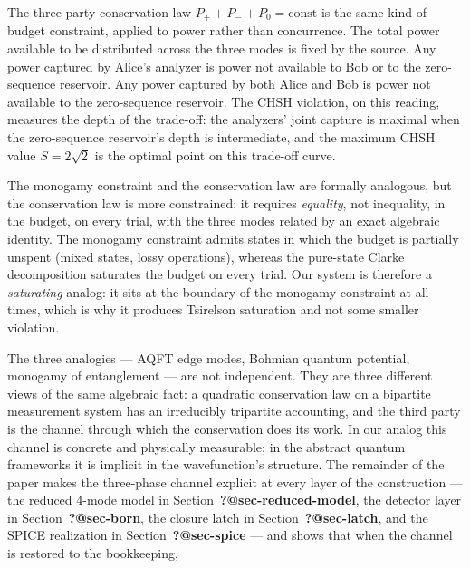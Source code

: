 \documentclass[
  11pt]{article}
\begin{document}
The three-party conservation law \(P_+ + P_- + P_0 = \mathrm{const}\) is
the same kind of budget constraint, applied to power rather than
concurrence. The total power available to be distributed across the
three modes is fixed by the source. Any power captured by Alice's
analyzer is power not available to Bob or to the zero-sequence
reservoir. Any power captured by both Alice and Bob is power not
available to the zero-sequence reservoir. The CHSH violation, on this
reading, measures the depth of the trade-off: the analyzers' joint
capture is maximal when the zero-sequence reservoir's depth is
intermediate, and the maximum CHSH value \(S = 2\sqrt{2}\) is the
optimal point on this trade-off curve.

The monogamy constraint and the conservation law are formally analogous,
but the conservation law is more constrained: it requires
\emph{equality}, not inequality, in the budget, on every trial, with the
three modes related by an exact algebraic identity. The monogamy
constraint admits states in which the budget is partially unspent (mixed
states, lossy operations), whereas the pure-state Clarke decomposition
saturates the budget on every trial. Our system is therefore a
\emph{saturating} analog: it sits at the boundary of the monogamy
constraint at all times, which is why it produces Tsirelson saturation
and not some smaller violation.

The three analogies --- AQFT edge modes, Bohmian quantum potential,
monogamy of entanglement --- are not independent. They are three
different views of the same algebraic fact: a quadratic conservation law
on a bipartite measurement system has an irreducibly tripartite
accounting, and the third party is the channel through which the
conservation does its work. In our analog this channel is concrete and
physically measurable; in the abstract quantum frameworks it is implicit
in the wavefunction's structure. The remainder of the paper makes the
three-phase channel explicit at every layer of the construction --- the
reduced 4-mode model in Section~\textbf{?@sec-reduced-model}, the
detector layer in Section~\textbf{?@sec-born}, the closure latch in
Section~\textbf{?@sec-latch}, and the SPICE realization in
Section~\textbf{?@sec-spice} --- and shows that when the channel is
restored to the bookkeeping,
\end{document}
